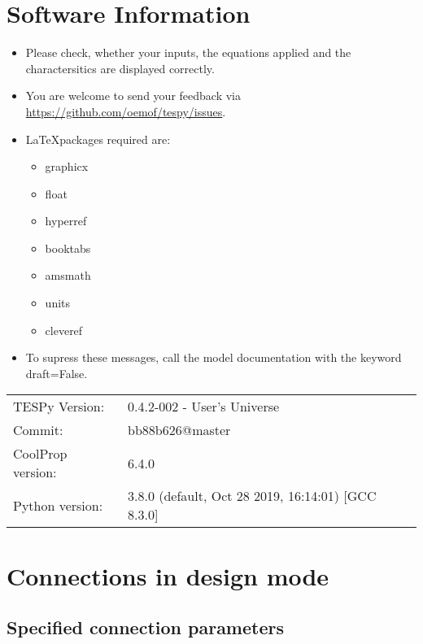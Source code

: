 \section*{Software Information}

\begin{itemize}
\item Please check, whether your inputs, the equations applied and the charactersitics are displayed correctly.
\item You are welcome to send your feedback via \url{https://github.com/oemof/tespy/issues}.
\item \LaTeX packages required are:
\begin{itemize}
\item graphicx
\item float
\item hyperref
\item booktabs
\item amsmath
\item units
\item cleveref
\end{itemize}
\item To supress these messages, call the model documentation with the keyword draft=False.
\end{itemize}

\begin{table}[H]
\begin{tabular}{ll}
TESPy Version:&0.4.2-002 - User's Universe\\
Commit:&bb88b626@master\\
CoolProp version:&6.4.0\\
Python version:&3.8.0 (default, Oct 28 2019, 16:14:01) 
[GCC 8.3.0]\\
\end{tabular}
\end{table}
\newpage\section{Connections in design mode}

\subsection{Specified connection parameters}

